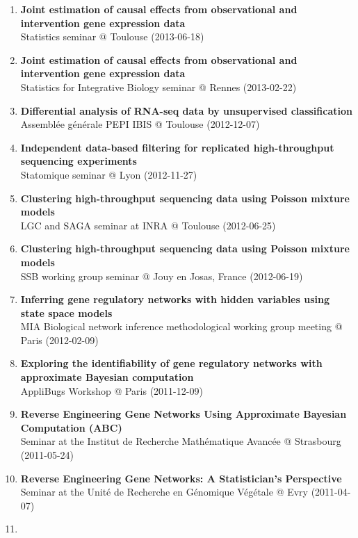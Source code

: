 \documentclass[11pt, a4paper]{awesome-cv}
\begin{document}
\begin{enumerate}
{  intervention gene expression data}\\
  AppliBUGS Workshop @ Paris (2013-06-20)
\item
  \textbf{Joint estimation of causal effects from observational and
  intervention gene expression data}\\
  Statistics seminar @ Toulouse (2013-06-18)
\item
  \textbf{Joint estimation of causal effects from observational and
  intervention gene expression data}\\
  Statistics for Integrative Biology seminar @ Rennes (2013-02-22)
\item
  \textbf{Differential analysis of RNA-seq data by unsupervised
  classification}\\
  Assemblée générale PEPI IBIS @ Toulouse (2012-12-07)
\item
  \textbf{Independent data-based filtering for replicated
  high-throughput sequencing experiments}\\
  Statomique seminar @ Lyon (2012-11-27)
\item
  \textbf{Clustering high-throughput sequencing data using Poisson
  mixture models}\\
  LGC and SAGA seminar at INRA @ Toulouse (2012-06-25)
\item
  \textbf{Clustering high-throughput sequencing data using Poisson
  mixture models}\\
  SSB working group seminar @ Jouy en Josas, France (2012-06-19)
\item
  \textbf{Inferring gene regulatory networks with hidden variables using
  state space models}\\
  MIA Biological network inference methodological working group meeting
  @ Paris (2012-02-09)
\item
  \textbf{Exploring the identifiability of gene regulatory networks with
  approximate Bayesian computation}\\
  AppliBugs Workshop @ Paris (2011-12-09)
\item
  \textbf{Reverse Engineering Gene Networks Using Approximate Bayesian
  Computation (ABC)}\\
  Seminar at the Institut de Recherche Mathématique Avancée @ Strasbourg
  (2011-05-24)
\item
  \textbf{Reverse Engineering Gene Networks: A Statistician's
  Perspective}\\
  Seminar at the Unité de Recherche en Génomique Végétale @ Evry
  (2011-04-07)
\item

\end{enumerate}
\end{document}
